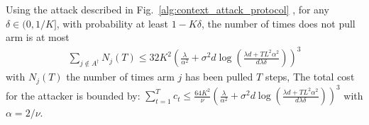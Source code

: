 


\begin{prop}
\label{prop:cost_attack_all_ctx}
	Using the attack described in Fig.~\ref{alg:context_attack_protocol} , for any $\delta\in (0,1/K]$, with probability at least $1 - K\delta$, the number of times \linucb does not pull  arm   is at most     
        \begin{align*}
                \sum_{j\notin A^{\dagger}} N_{j}(T) \leq 32K^{2}\left( \frac{\lambda}{\alpha^{2}} + \sigma^{2}d\log\left(\frac{\lambda d + TL^2\alpha^{2}}{d\lambda\delta}\right) \right)^{3}
        \end{align*}
	with $N_{j}(T)$ the number of times arm $j$ has been pulled $T$ steps, 
The total cost for the attacker is bounded by: $   \sum_{t=1}^{T} c_{t} \leq \frac{64K^{2}}{\nu}\left( \frac{\lambda}{\alpha^{2}} + \sigma^{2}d\log\left(\frac{\lambda d + TL^2\alpha^{2}}{d\lambda\delta}\right) \right)^{3}$ with $\alpha = 2/\nu$. 
\end{prop}

